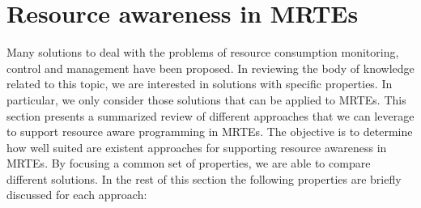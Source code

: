 \section{Resource awareness in MRTEs} \label{sec:resource-awareness-related-work}

Many solutions to deal with the problems of resource consumption monitoring, control and management have been proposed.
In reviewing the body of knowledge related to this topic, we are interested in solutions with specific properties.
In particular, we only consider those solutions that can be applied to MRTEs.
This section presents a summarized review of different approaches that we can leverage to support resource aware programming in MRTEs.
The objective is to determine how well suited are existent approaches for supporting resource awareness in MRTEs.
By focusing a common set of properties, we are able to compare different solutions.
In the rest of this section the following properties are briefly discussed for each approach: 

